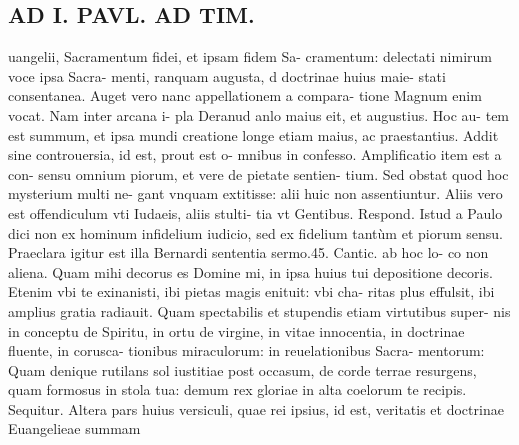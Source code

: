\documentclass{article}
\begin{document}
\begin{pages}
\section*{AD I. PAVL. AD TIM. }
\marginpar{[ p.170 ]}\pstart uangelii, Sacramentum fidei, et ipsam fidem Sa- cramentum: delectati nimirum voce ipsa Sacra- menti, ranquam augusta, d doctrinae huius maie- stati consentanea.  \pend\pstart Auget vero nanc appellationem a compara- tione Magnum enim vocat. Nam inter arcana i- pla Deranud anlo maius eit, et augustius. Hoc au- tem est summum, et ipsa mundi creatione longe etiam maius, ac praestantius.  \pend\pstart Addit sine controuersia, id est, prout est o- mnibus in confesso. Amplificatio item est a con- sensu omnium piorum, et vere de pietate sentien- tium. Sed obstat quod hoc mysterium multi ne- gant vnquam extitisse: alii huic non assentiuntur. Aliis vero est offendiculum vti Iudaeis, aliis stulti- tia vt Gentibus. Respond. Istud a Paulo dici non ex hominum infidelium iudicio, sed ex fidelium tantùm et piorum sensu. Praeclara igitur est illa Bernardi sententia sermo.45. Cantic. ab hoc lo- co non aliena. Quam mihi decorus es Domine mi, in ipsa huius tui depositione decoris. Etenim vbi te exinanisti, ibi pietas magis enituit: vbi cha- ritas plus effulsit, ibi amplius gratia radiauit. Quam spectabilis et stupendis etiam virtutibus super- nis in conceptu de Spiritu, in ortu de virgine, in vitae innocentia, in doctrinae fluente, in corusca- tionibus miraculorum: in reuelationibus Sacra- mentorum: Quam denique rutilans sol iustitiae post occasum, de corde terrae resurgens, quam formosus in stola tua: demum rex gloriae in alta coelorum te recipis. Sequitur.  \pend\pstart Altera pars huius versiculi, quae rei ipsius, id est, veritatis et doctrinae Euangelieae summam  \pend

\end{pages}
\end{document}
